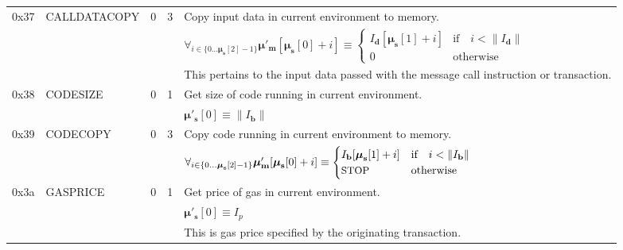 \documentclass[9pt,oneside]{amsart}
\begin{document}
\begin{tabular*}{\columnwidth}[h]{rlrrl}
\midrule
0x37 & {\small CALLDATACOPY} & 0 & 3 & Copy input data in current environment to memory. \\
&&&& $\forall_{i \in \{ 0 \dots \boldsymbol{\mu}_\mathbf{s}[2] - 1\} } \boldsymbol{\mu}'_\mathbf{m}[\boldsymbol{\mu}_\mathbf{s}[0] + i ] \equiv
\begin{cases} I_\mathbf{d}[\boldsymbol{\mu}_\mathbf{s}[1] + i] & \text{if} \quad i < \lVert I_\mathbf{d} \rVert \\ 0 & \text{otherwise} \end{cases}$\\
&&&& This pertains to the input data passed with the message call instruction or transaction. \\
\midrule
0x38 & {\small CODESIZE} & 0 & 1 & Get size of code running in current environment. \\
&&&& $\boldsymbol{\mu}'_\mathbf{s}[0] \equiv \lVert I_\mathbf{b} \rVert$ \\
\midrule
0x39 & {\small CODECOPY} & 0 & 3 & Copy code running in current environment to memory. \\
&&&& $\forall_{i \in \{ 0 \dots \boldsymbol{\mu}_\mathbf{s}[2] - 1\} } \boldsymbol{\mu}'_\mathbf{m}[\boldsymbol{\mu}_\mathbf{s}[0] + i ] \equiv
\begin{cases} I_\mathbf{b}[\boldsymbol{\mu}_\mathbf{s}[1] + i] & \text{if} \quad i < \lVert I_\mathbf{b} \rVert \\ \text{\small STOP} & \text{otherwise} \end{cases}$\\
\midrule
0x3a & {\small GASPRICE} & 0 & 1 & Get price of gas in current environment. \\
&&&& $\boldsymbol{\mu}'_\mathbf{s}[0] \equiv I_p$ \\
&&&& This is gas price specified by the originating transaction.\\
\bottomrule
\end{tabular*}
\end{document}

